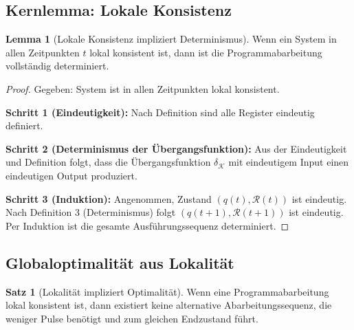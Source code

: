 \documentclass[a4paper,12pt]{article}
\theoremstyle{definition}
\newtheorem{satz}{Satz}
\newtheorem{lemma}{Lemma}
\begin{document}
	\subsection{Kernlemma: Lokale Konsistenz}
	
	\begin{lemma}[Lokale Konsistenz impliziert Determinismus]
		\label{lem:lokale_konsistenz}
		Wenn ein System in allen Zeitpunkten $t$ lokal konsistent ist, dann ist die Programmabarbeitung vollständig determiniert.
	\end{lemma}
	
	\begin{proof}
		Gegeben: System ist in allen Zeitpunkten lokal konsistent.
		
		\textbf{Schritt 1 (Eindeutigkeit):} Nach Definition sind alle Register eindeutig definiert.
		
		\textbf{Schritt 2 (Determinismus der Übergangsfunktion):} Aus der Eindeutigkeit und Definition folgt, dass die Übergangsfunktion $\delta_{\mathcal{K}}$ mit eindeutigem Input einen eindeutigen Output produziert.
		
		\textbf{Schritt 3 (Induktion):} Angenommen, Zustand $(q(t), \mathcal{R}(t))$ ist eindeutig. Nach Definition 3 (Determinismus) folgt $(q(t+1), \mathcal{R}(t+1))$ ist eindeutig. Per Induktion ist die gesamte Ausführungssequenz determiniert.
	\end{proof}
	
	\subsection{Globaloptimalität aus Lokalität}
	
	\begin{satz}[Lokalität impliziert Optimalität]
		\label{satz:lokalitaet_optimal}
		Wenn eine Programmabarbeitung lokal konsistent ist, dann existiert keine alternative Abarbeitungssequenz, die weniger Pulse benötigt und zum gleichen Endzustand führt.
	\end{satz}
	
\end{document}
